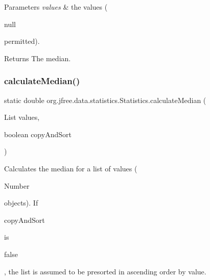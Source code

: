 \begin{DoxyParams}{Parameters}
{\em values} & the values (
\begin{DoxyCode}
null 
\end{DoxyCode}
 permitted).\\
\hline
\end{DoxyParams}
\begin{DoxyReturn}{Returns}
The median. 
\end{DoxyReturn}
\mbox{\label{classorg_1_1jfree_1_1data_1_1statistics_1_1_statistics_a473dcad23f5bb87f704c62562554c89b}} 
\subsubsection{\texorpdfstring{calculate\+Median()}{calculateMedian()}\hspace{0.1cm}{\footnotesize\ttfamily [2/4]}}
{\footnotesize\ttfamily static double org.\+jfree.\+data.\+statistics.\+Statistics.\+calculate\+Median (\begin{DoxyParamCaption}\item[{List}]{values,  }\item[{boolean}]{copy\+And\+Sort }\end{DoxyParamCaption})\hspace{0.3cm}{\ttfamily [static]}}

Calculates the median for a list of values (
\begin{DoxyCode}
Number 
\end{DoxyCode}
 objects). If
\begin{DoxyCode}
copyAndSort 
\end{DoxyCode}
 is
\begin{DoxyCode}
\textcolor{keyword}{false} 
\end{DoxyCode}
 , the list is assumed to be presorted in ascending order by value.


